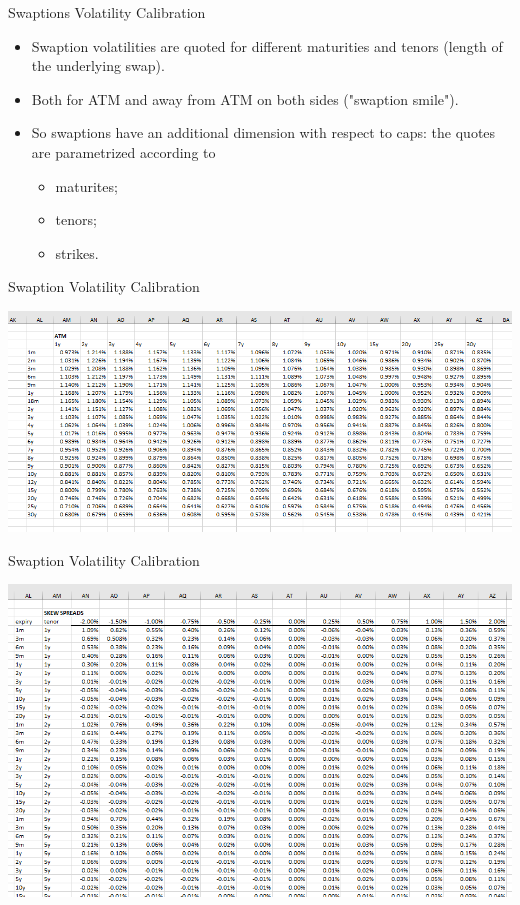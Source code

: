 \documentclass{beamer}
\begin{document}
\begin{frame}{Swaptions Volatility Calibration}
\begin{itemize}
	\item Swaption volatilities are quoted for different maturities and tenors (length of the underlying swap).
	\item Both for ATM and away from ATM on both sides ("swaption smile").
	\item So swaptions have an additional dimension with respect to caps: the quotes are parametrized according to 
	\begin{itemize}
		\item maturites;
		\item tenors;
		\item strikes.
	\end{itemize}
\end{itemize}
\end{frame}

\begin{frame}{Swaption Volatility Calibration}
  \begin{center}
    \includegraphics[width=1.\linewidth]{images/atm_vol}
  \end{center}
\end{frame}

\begin{frame}{Swaption Volatility Calibration}
  \begin{center}
    \includegraphics[width=1.\linewidth]{images/skews}
  \end{center}
\end{frame}
\end{document}

